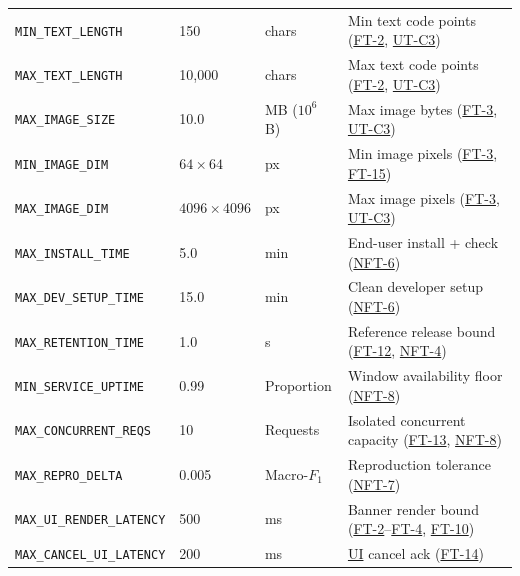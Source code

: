 \documentclass[12pt, titlepage]{article}
\newcommand{\UI}{\hyperlink{vnv-acr-ui}{UI}}
\begin{document}
\begin{tabularx}{\textwidth}{Q{4.8cm} P{1.5cm} P{1.9cm} Y}
\label{const:MIN_TEXT_LENGTH}\texttt{MIN\_\allowbreak{}TEXT\_\allowbreak{}LENGTH} & 150 & chars & Min text code points (\hyperref[test:FT-2]{FT-2}, \hyperref[ut:C3]{UT-C3})\\
\label{const:MAX_TEXT_LENGTH}\texttt{MAX\_\allowbreak{}TEXT\_\allowbreak{}LENGTH} & 10{,}000 & chars & Max text code points (\hyperref[test:FT-2]{FT-2}, \hyperref[ut:C3]{UT-C3})\\
\label{const:MAX_IMAGE_SIZE}\texttt{MAX\_\allowbreak{}IMAGE\_\allowbreak{}SIZE} & 10.0 & MB ($10^6$ B) & Max image bytes (\hyperref[test:FT-3]{FT-3}, \hyperref[ut:C3]{UT-C3})\\
\label{const:MIN_IMAGE_DIM}\texttt{MIN\_\allowbreak{}IMAGE\_\allowbreak{}DIM} & $64 \times 64$ & px & Min image pixels (\hyperref[test:FT-3]{FT-3}, \hyperref[test:FT-15]{FT-15})\\
\label{const:MAX_IMAGE_DIM}\texttt{MAX\_\allowbreak{}IMAGE\_\allowbreak{}DIM} & $4096 \times 4096$ & px & Max image pixels (\hyperref[test:FT-3]{FT-3}, \hyperref[ut:C3]{UT-C3})\\
\label{const:MAX_INSTALL_TIME}\texttt{MAX\_\allowbreak{}INSTALL\_\allowbreak{}TIME} & 5.0 & min & End-user install + check (\hyperref[test:NFT-6]{NFT-6})\\
\label{const:MAX_DEV_SETUP_TIME}\texttt{MAX\_\allowbreak{}DEV\_\allowbreak{}SETUP\_\allowbreak{}TIME} & 15.0 & min & Clean developer setup (\hyperref[test:NFT-6]{NFT-6})\\
\label{const:MAX_RETENTION_TIME}\texttt{MAX\_\allowbreak{}RETENTION\_\allowbreak{}TIME} & 1.0 & s & Reference release bound (\hyperref[test:FT-12]{FT-12}, \hyperref[test:NFT-4]{NFT-4})\\
\label{const:MIN_SERVICE_UPTIME}\texttt{MIN\_\allowbreak{}SERVICE\_\allowbreak{}UPTIME} & 0.99 & Proportion & Window availability floor (\hyperref[test:NFT-8]{NFT-8})\\
\label{const:MAX_CONCURRENT_REQS}\texttt{MAX\_\allowbreak{}CONCURRENT\_\allowbreak{}REQS} & 10 & Requests & Isolated concurrent capacity (\hyperref[test:FT-13]{FT-13}, \hyperref[test:NFT-8]{NFT-8})\\
\label{const:MAX_REPRO_DELTA}\texttt{MAX\_\allowbreak{}REPRO\_\allowbreak{}DELTA} & 0.005 & Macro-$F_1$ & Reproduction tolerance (\hyperref[test:NFT-7]{NFT-7})\\
\label{const:MAX_UI_RENDER_LATENCY}\texttt{MAX\_\allowbreak{}UI\_\allowbreak{}RENDER\_\allowbreak{}LATENCY} & 500 & ms & Banner render bound (\hyperref[test:FT-2]{FT-2}--\hyperref[test:FT-4]{FT-4}, \hyperref[test:FT-10]{FT-10})\\
\label{const:MAX_CANCEL_UI_LATENCY}\texttt{MAX\_\allowbreak{}CANCEL\_\allowbreak{}UI\_\allowbreak{}LATENCY} & 200 & ms & \UI{} cancel ack (\hyperref[test:FT-14]{FT-14})\\
\end{tabularx}
\endgroup
\end{document}
